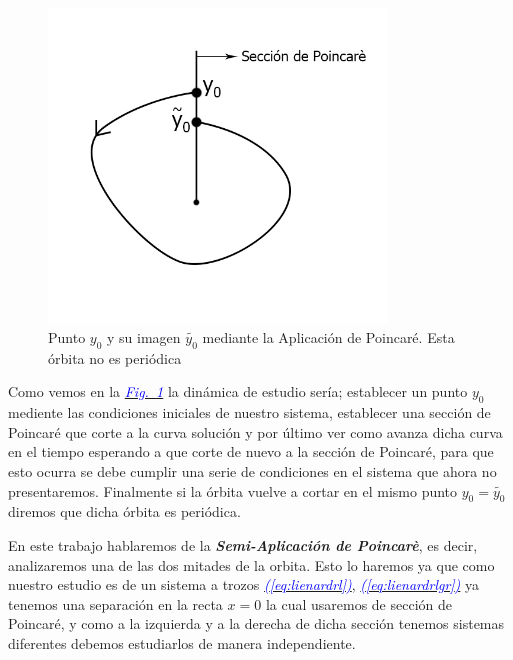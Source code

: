 \documentclass[12pt,a4paper]{report} %
\newcommand{\fref}[1]{\hyperref[#1]{\textcolor{blue}{\textit{Fig.~\ref*{#1}}}}}
\newcommand{\eref}[1]{\hyperref[#1]{\textcolor{blue}{\textit{(\ref*{#1})}}}}
\begin{document}
	\begin{figure}[h]
		\centering
		\includegraphics[width=0.8\textwidth]{aplipoincare2.jpg}
		\caption{Punto $y_0$ y su imagen $\tilde{y_0}$ mediante la Aplicación de Poincaré. Esta órbita no es periódica}
		\label{fig:aplipoincare2}
	\end{figure}\smallskip
	
\noindent Como vemos en la \fref{fig:aplipoincare2} la dinámica de estudio sería; establecer un punto $y_0$ mediente las condiciones iniciales de nuestro sistema, establecer una sección de Poincaré que corte a la curva solución y por último ver como avanza dicha curva en el tiempo esperando a que corte de nuevo a la sección de Poincaré, para que esto ocurra se debe cumplir una serie de condiciones en el sistema que ahora no presentaremos. Finalmente si la órbita vuelve a cortar en el mismo punto $y_0=\tilde{y_0}$ diremos que dicha órbita es periódica. 
	\newpage
	
	En este trabajo hablaremos de la \textit{\textbf{Semi-Aplicación de Poincarè}}, es decir, analizaremos una de las dos mitades de la orbita. Esto lo haremos ya que como nuestro estudio es de un sistema a trozos \eref{eq:lienardrl}, \eref{eq:lienardrlgr} ya tenemos una separación en la recta $x=0$ la cual usaremos de sección de Poincaré, y como a la izquierda y a la derecha de dicha sección tenemos sistemas diferentes debemos estudiarlos de manera independiente.
	
\end{document}
